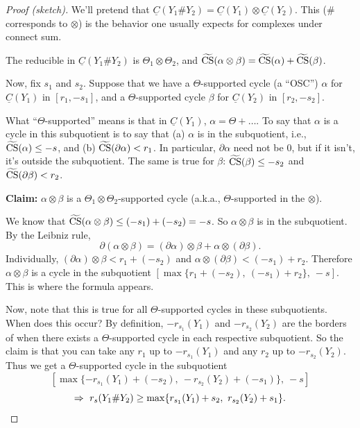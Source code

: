 \documentclass[main]{subfiles}
\begin{document}
\begin{proof}[Proof (sketch)]
We'll pretend that $\underline{C}(Y_1\#Y_2) = \underline{C}(Y_1)\otimes\underline{C}(Y_2)$. This ($\#$ corresponds to $\otimes$) is the behavior one usually expects for complexes under connect sum.

The reducible in $\underline{C}(Y_1\#Y_2)$ is $\Theta_1\otimes\Theta_2$, and $\widetilde{\operatorname{CS}}(\alpha\otimes\beta) = \widetilde{\operatorname{CS}}(\alpha)+\widetilde{\operatorname{CS}}(\beta)$.

Now, fix $s_1$ and $s_2$. Suppose that we have a $\Theta$-supported cycle (a ``OSC'') $\alpha$ for $\underline{C}(Y_1)$ in $[r_1,-s_1]$, and a $\Theta$-supported cycle $\beta$ for $\underline{C}(Y_2)$ in $[r_2,-s_2]$.

What ``$\Theta$-supported'' means is that in $\underline{C}(Y_1)$, $\alpha = \Theta+\dots$. To say that $\alpha$ is a cycle in this subquotient is to say that (a) $\alpha$ is in the subquotient, i.e., $\widetilde{\operatorname{CS}}(\alpha)\leq -s$, and (b) $\widetilde{\operatorname{CS}}(\partial\alpha)<r_1$. In particular, $\partial\alpha$ need not be $0$, but if it isn't, it's outside the subquotient. The same is true for $\beta$: $\widetilde{\operatorname{CS}}(\beta)\leq -s_2$ and $\widetilde{\operatorname{CS}}(\partial\beta)<r_2$.

\textbf{Claim:} $\alpha\otimes\beta$ is a $\Theta_1\otimes\Theta_2$-supported cycle (a.k.a., $\Theta$-supported in the $\otimes$).

We know that $\widetilde{\operatorname{CS}}(\alpha\otimes\beta)\leq (-s_1)+(-s_2)=-s$. So $\alpha\otimes\beta$ is in the subquotient. By the Leibniz rule,
\[
\partial(\alpha\otimes\beta) = (\partial\alpha)\otimes\beta + \alpha\otimes(\partial\beta).
\]
Individually, $(\partial\alpha)\otimes\beta < r_1+(-s_2)$ and $\alpha\otimes(\partial\beta) < (-s_1)+r_2$. Therefore $\alpha\otimes\beta$ is a cycle in the subquotient $\left[\max\{r_1+(-s_2),\ (-s_1)+r_2\},\ -s\right]$. This is where the formula appears.

Now, note that this is true for all $\Theta$-supported cycles in these subquotients. When does this occur? By definition, $-r_{s_1}(Y_1)$ and $-r_{s_2}(Y_2)$ are the borders of when there exists a $\Theta$-supported cycle in each respective subquotient. So the claim is that you can take any $r_1$ up to $-r_{s_1}(Y_1)$ and any $r_2$ up to $-r_{s_2}(Y_2)$. Thus we get a $\Theta$-supported cycle in the subquotient
\[
\left[\max\{-r_{s_1}(Y_1)+(-s_2),\ -r_{s_2}(Y_2)+(-s_1)\},\ -s\right]
\]
\[
\Rightarrow\ r_s(Y_1\#Y_2) \geq \max\{r_{s_1}(Y_1)+s_2,\ r_{s_2}(Y_2)+s_1\}. \qedhere
\]
\end{proof}
\end{document}
